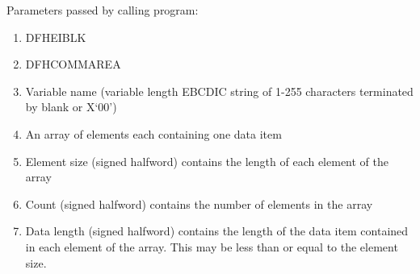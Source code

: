 \documentclass[letterpaper,10pt,english]{sphinxmanual}
\begin{document}
Parameters passed by calling program:
\begin{enumerate}
\item {} 
DFHEIBLK

\item {} 
DFHCOMMAREA

\item {} 
Variable name (variable length EBCDIC string of 1-255 characters terminated by blank or X‘00’)

\item {} 
An array of elements each containing one data item

\item {} 
Element size (signed halfword) contains the length of each element of the array

\item {} 
Count (signed halfword) contains the number of elements in the array

\item {} 
Data length (signed halfword) contains the length of the data item contained in each element of the array. This may be less than or equal to the element size.

\end{enumerate}

\end{document}
